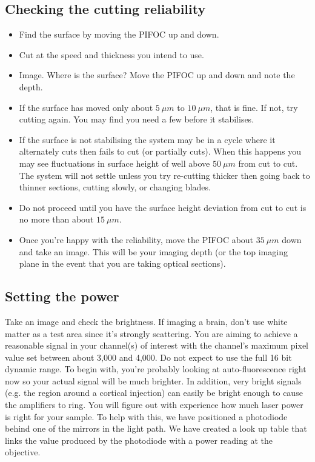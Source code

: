 \documentclass[paper=a4, fontsize=11pt]{scrartcl} %
\numberwithin{equation}{section} %
\numberwithin{figure}{section} %
\numberwithin{table}{section} %
\begin{document}
\subsection{Checking the cutting reliability}
\begin{itemize}
\item Find the surface by moving the PIFOC up and down. 
\item Cut at the speed and thickness you intend to use.
\item Image. Where is the surface? Move the PIFOC up and down and note the depth.  
\item If the surface has moved only about $5~\mu m$ to $10~\mu m$, that is fine. 
If not, try cutting again. 
You may find you need a few before it stabilises. 

\item If the surface is not stabilising the system may be in a cycle where it alternately cuts then fails to cut (or partially cuts). 
When this happens you may see fluctuations in surface height of well above $50~\mu m$ from cut to cut.
The system will not settle unless you try re-cutting thicker then going back to thinner sections, cutting slowly, or changing blades.
\item Do not proceed until you have the surface height deviation from cut to cut is no more than about $15~\mu m$. 
\item Once you're happy with the reliability, move the PIFOC about $35~\mu m$ down and take an image. 
This will be your imaging depth (or the top imaging plane in the event that you are taking optical sections). 
\end{itemize}

\clearpage

\subsection{Setting the power}
Take an image and check the brightness. If imaging a brain, don't use white matter as a test area since it's strongly scattering. 
You are aiming to achieve a reasonable signal in your channel(s) of interest with the channel's maximum pixel value set 
between about 3,000 and 4,000. 
Do not expect to use the full 16 bit dynamic range. 
To begin with, you're probably looking at auto-fluorescence right now so your actual signal will be much brighter. 
In addition, very bright signals (e.g. the region around a cortical injection) can easily be bright enough to cause the amplifiers to ring.
You will figure out with experience how much laser power is right for your sample. 
To help with this, we have positioned a photodiode behind one of the mirrors in the light path. 
We have created a look up table that links the value produced by the photodiode with a power reading at the objective. 
\end{document}
